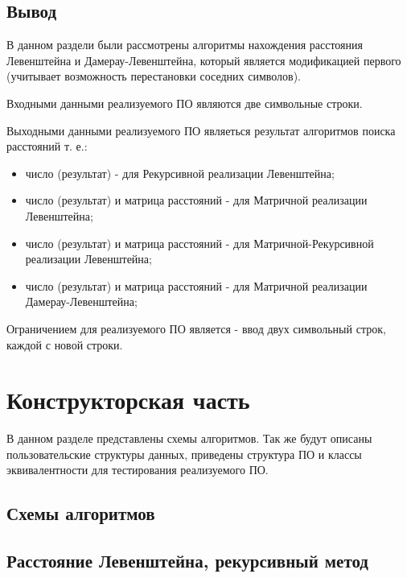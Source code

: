 \documentclass[12pt,a4paper]{report}
\begin{document}
\section*{Вывод}

В данном раздели были рассмотрены алгоритмы нахождения расстояния Левенштейна и Дамерау-Левенштейна, который является модификацией первого (учитывает возможность перестановки соседних символов).

Входными данными реализуемого ПО являются две символьные строки.

Выходными данными реализуемого ПО являеться результат алгоритмов поиска расстояний т. е.:
\begin{itemize}
	\item число (результат) - для Рекурсивной реализации Левенштейна;
	\item число (результат) и матрица расстояний - для Матричной реализации Левенштейна;
	\item число (результат) и матрица расстояний - для Матричной-Рекурсивной реализации Левенштейна;
	\item число (результат) и матрица расстояний - для Матричной реализации Дамерау-Левенштейна;
\end{itemize}

Ограничением для реализуемого ПО является - ввод двух символьный строк, каждой с новой строки.



\newpage
\chapter{Конструкторская часть}

В данном разделе представлены схемы алгоритмов. Так же будут описаны пользовательские структуры данных, приведены структура ПО и классы эквивалентности для тестирования реализуемого ПО.

\section{Схемы алгоритмов}

\section*{Расстояние Левенштейна, рекурсивный метод}
\end{document}
